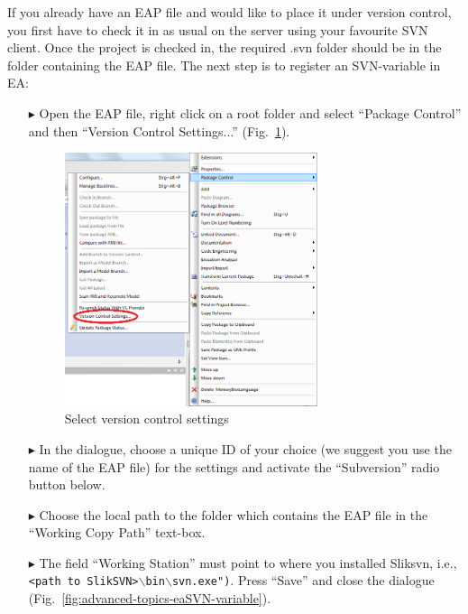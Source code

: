 If you already have an EAP file and would like to place it under version control, you first have to check it in as usual on the server using your favourite SVN client. 
Once the project is checked in, the required .svn folder should be in the folder containing the EAP file.
The next step is to register an SVN-variable in EA:
\begin{enumerate}
  \item[$\blacktriangleright$] Open the EAP file, right click on a root folder and select ``Package Control'' and then ``Version Control Settings...'' (Fig.~\ref{fig:advanced-topics-eaSVN-rightclick}).
\begin{figure}[!htbp]
\begin{center}
 	\includegraphics[width=0.7\textwidth]{pics/advancedTopics/eaSVN/rightclick}
	\caption{Select version control settings}
  	\label{fig:advanced-topics-eaSVN-rightclick}
\end{center} 
\end{figure}
  \item[$\blacktriangleright$] In the dialogue, choose a unique ID of your choice (we suggest you use the name of the EAP file) for the settings and activate the ``Subversion'' radio button below.
  \item[$\blacktriangleright$] Choose the local path to the folder which contains the EAP file in the ``Working Copy Path'' text-box.
  \item[$\blacktriangleright$] The field ``Working Station'' must point to where you installed Sliksvn, i.e., \texttt{<path to SlikSVN>$\backslash$bin$\backslash$svn.exe")}.  
  Press ``Save'' and close the dialogue (Fig.~\ref{fig:advanced-topics-eaSVN-variable}).

\end{enumerate}
